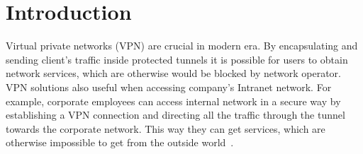 \section{Introduction}
\label{section:introduction}

Virtual private networks (VPN) are crucial in modern era.
By encapsulating and sending client’s traffic inside protected
tunnels it is possible for users to obtain network services,
which are otherwise would be blocked by network operator.
VPN solutions also useful when accessing company’s Intranet
network. For example, corporate employees can access internal
network in a secure way by establishing a VPN connection and
directing all the traffic through the tunnel towards the corporate
network. This way they can get services, which are otherwise
impossible to get from the outside world~\cite{breakingdvbcsa}.